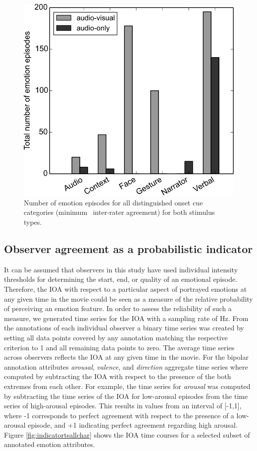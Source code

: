 \begin{figure}
  \centering
  \includegraphics[width=\linewidth]{figures/labeledoncue_episodes}
  \caption{Number of emotion episodes for all distinguished onset cue categories
    (minimum \AVAggThresh\ inter-rater agreement) for both stimulus types.}
  \label{fig:threshlabeledoncue}
\end{figure}

\subsection*{Observer agreement as a probabilistic indicator}

It can be assumed that observers in this study have used individual intensity
thresholds for determining the start, end, or quality of an emotional episode.
Therefore, the IOA with respect to a particular aspect of
portrayed emotions at any given time in the movie could be seen as a measure of
the relative probability of perceiving an emotion feature. In order to assess
the reliability of such a measure, we generated time series for the
IOA with a sampling rate of \unit[1]{Hz}. From the
annotations of each individual observer a binary time series was created by
setting all data points covered by any annotation matching the respective
criterion to 1 and all remaining data points to zero. The average time series
across observers reflects the IOA at any given time in the
movie. For the bipolar annotation attributes \textit{arousal},
\textit{valence}, and \textit{direction} aggregate time series where computed
by subtracting the IOA with respect to the presence of the
both extremes from each other.  For example, the time series for
\textit{arousal} was computed by subtracting the time series of the
IOA for low-arousal episodes from the time series of
high-arousal episodes. This results in values from an interval of [-1,1], where
-1 corresponds to perfect agreement with respect to the presence of a
low-arousal episode, and +1 indicating perfect agreement regarding high
arousal. Figure \ref{fig:indicatortsallchar} shows the IOA
time courses for a selected subset of annotated emotion attributes.

